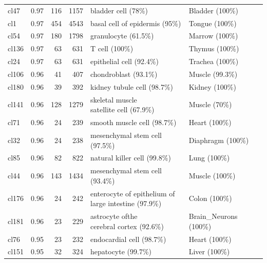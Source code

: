 \begin{table}[ht!]
\begin{tabular}{lrrrll}
  cl47 & 0.97 & 116 & 1157 & bladder cell (78\%) & Bladder (100\%) \\ 
  cl1 & 0.97 & 454 & 4543 & basal cell of epidermis (95\%) & Tongue (100\%) \\ 
  cl54 & 0.97 & 180 & 1798 & granulocyte (61.5\%) & Marrow (100\%) \\ 
  cl136 & 0.97 &  63 & 631 & T cell (100\%) & Thymus (100\%) \\ 
  cl24 & 0.97 &  63 & 631 & epithelial cell (92.4\%) & Trachea (100\%) \\ 
  cl106 & 0.96 &  41 & 407 & chondroblast (93.1\%) & Muscle (99.3\%) \\ 
  cl180 & 0.96 &  39 & 392 & kidney tubule cell (98.7\%) & Kidney (100\%) \\ 
  cl141 & 0.96 & 128 & 1279 & \specialcell[t]{skeletal muscle\\satellite cell (67.9\%)} & Muscle (70\%) \\ 
  cl71 & 0.96 &  24 & 239 & smooth muscle cell (98.7\%) & Heart (100\%) \\ 
  cl32 & 0.96 &  24 & 238 & mesenchymal stem cell (97.5\%) & Diaphragm (100\%) \\ 
  cl85 & 0.96 &  82 & 822 & natural killer cell (99.8\%) & Lung (100\%) \\ 
  cl44 & 0.96 & 143 & 1434 & mesenchymal stem cell (93.4\%) & Muscle (100\%) \\ 
  cl176 & 0.96 &  24 & 242 & \specialcell[t]{enterocyte of epithelium of\\large intestine (97.9\%)} & Colon (100\%) \\ 
  cl181 & 0.96 &  23 & 229 & \specialcell[t]{astrocyte ofthe\\cerebral cortex (92.6\%)} & Brain\_Neurons (100\%) \\ 
  cl76 & 0.95 &  23 & 232 & endocardial cell (98.7\%) & Heart (100\%) \\ 
  cl151 & 0.95 &  32 & 324 & hepatocyte (99.7\%) & Liver (100\%) \\ 
   \bottomrule
\end{tabular}
\end{table}

